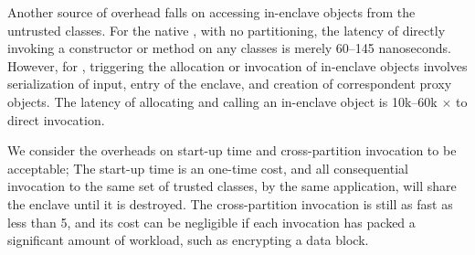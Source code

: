 Another source of overhead falls on accessing in-enclave objects
from the untrusted classes.
For the native \jvm{}, with no partitioning, the latency of directly invoking a constructor or method
on any classes is merely 60--145 nanoseconds.
However, for \sysname{}, triggering the allocation or invocation of in-enclave objects involves serialization of input, entry of the enclave,
and creation of correspondent proxy objects. The latency of allocating and calling an in-enclave object is 10k--60k $\times$ to direct invocation.



We consider the overheads on start-up time and cross-partition invocation 
to be acceptable;
The start-up time is an one-time cost, and all consequential invocation to the same set of trusted classes, by the same application, will share the enclave until it is destroyed. 
The cross-partition invocation is still as fast as less than 5\usec{},
and its cost can be negligible if each invocation has packed a significant amount of workload, such as encrypting a data block.  

%				


